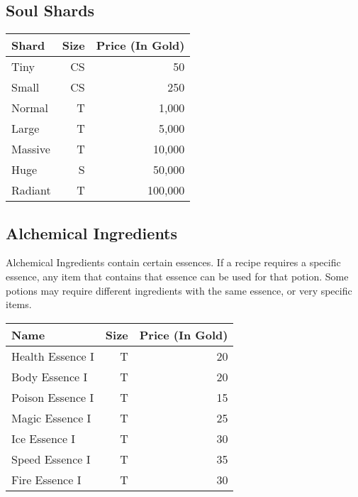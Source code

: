 \subsection{Soul Shards}\label{subsec:soulShards}
\begin{longtable}{l | r | r}
	Shard & Size & Price (In Gold)\\ \hline
	Tiny & CS & 50\\
	Small & CS & 250\\
	Normal & T & 1,000\\
	Large & T & 5,000\\
	Massive & T & 10,000\\
	Huge & S & 50,000\\
	Radiant & T & 100,000\\
\end{longtable}


\subsection{Alchemical Ingredients}\label{subsec:alchemicalIngredients}
Alchemical Ingredients contain certain essences.
If a recipe requires a specific essence, any item that contains that essence can be used for that potion.
Some potions may require different ingredients with the same essence, or very specific items. \\

\begin{longtable}{l | r | r}
	Name & Size & Price (In Gold)\\ \hline
	Health Essence I & T & 20\\
	Body Essence I & T & 20\\
	Poison Essence I & T & 15\\
	Magic Essence I & T & 25\\
	Ice Essence I & T & 30\\
	Speed Essence I & T & 35\\
	Fire Essence I & T & 30\\
\end{longtable}

